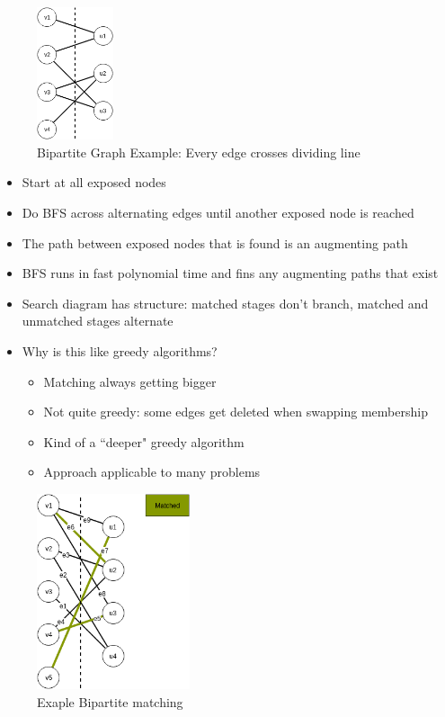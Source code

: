 \documentclass[12pt, letter]{article}
\begin{document}
\begin{figure}[h]
    \centering
    \includegraphics[width=0.2\textwidth]{bipartite}
    \caption{Bipartite Graph Example: Every edge crosses dividing line}
    \label{fig:bipartite}
\end{figure}
\begin{itemize}
    \item Start at all exposed nodes
    \item Do BFS across alternating edges until another exposed node is reached
    \item The path between exposed nodes that is found is an augmenting path
    \item BFS runs in fast polynomial time and fins any augmenting paths that exist
    \item Search diagram has structure: matched stages don't branch, matched and unmatched stages alternate
    \item Why is this like greedy algorithms?
    \begin{itemize}
        \item Matching always getting bigger
        \item Not quite greedy: some edges get deleted when swapping membership
        \item Kind of a ``deeper" greedy algorithm
        \item Approach applicable to many problems
    \end{itemize}
\end{itemize}
\begin{figure}[h]
    \centering
    \includegraphics[width=0.4\textwidth]{bipartite-matching}
    \caption{Exaple Bipartite matching}
    \label{fig:bipartite-matching}
\end{figure}
\end{document}
